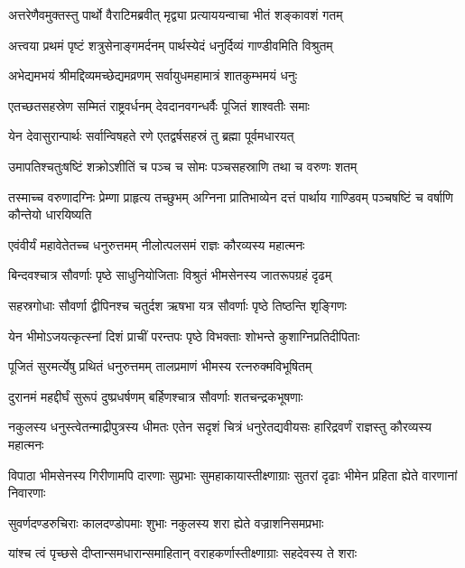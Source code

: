 \twolineshloka
{अत्तरेणैवमुक्तस्तु पार्थो वैराटिमब्रवीत्}
{मृद्व्या प्रत्याययन्वाचा भीतं शङ्कावशं गतम्}




\twolineshloka
{अत्त्वया प्रथमं पृष्टं शत्रुसेनाङ्गमर्दनम्}
{पार्थस्येदं धनुर्दिव्यं गाण्डीवमिति विश्रुतम्}


\twolineshloka
{अभेद्यमभयं श्रीमद्दिव्यमच्छेद्यमव्रणम्}
{सर्वायुधमहामात्रं शातकुम्भमयं धनुः}


\twolineshloka
{एतच्छतसहस्रेण सम्मितं राष्ट्रवर्धनम्}
{देवदानवगन्धर्वैः पूजितं शाश्वतीः समाः}


\twolineshloka
{येन देवासुरान्पार्थः सर्वान्विषहते रणे}
{एतद्वर्षसहस्रं तु ब्रह्मा पूर्वमधारयत्}


\twolineshloka
{उमापतिश्चतुःषष्टिं शक्रोऽशीतिं च पञ्च च}
{सोमः पञ्चसहस्राणि तथा च वरुणः शतम्}


\threelineshloka
{तस्माच्च वरुणादग्निः प्रेम्णा प्राहृत्य तच्छुभम्}
{अग्निना प्रातिभाव्येन दत्तं पार्थाय गाण्डिवम्}
{पञ्चषष्टिं च वर्षाणि कौन्तेयो धारयिष्यति}


\twolineshloka
{एवंवीर्यं महावेतेतच्च धनुरुत्तमम्}
{नीलोत्पलसमं राज्ञः कौरव्यस्य महात्मनः}


\twolineshloka
{बिन्दवश्चात्र सौवर्णाः पृष्ठे साधुनियोजिताः}
{विश्रुतं भीमसेनस्य जातरूपग्रहं दृढम्}


\twolineshloka
{सहस्रगोधाः सौवर्णा द्वीपिनश्च चतुर्दश}
{ऋषभा यत्र सौवर्णाः पृष्ठे तिष्ठन्ति शृङ्गिणः}


\twolineshloka
{येन भीमोऽजयत्कृत्स्नां दिशं प्राचीं परन्तपः}
{पृष्ठे विभक्ताः शोभन्ते कुशाग्निप्रतिदीपिताः}


\twolineshloka
{पूजितं सुरमर्त्येषु प्रथितं धनुरुत्तमम्}
{तालप्रमाणं भीमस्य रत्नरुक्मविभूषितम्}


\twolineshloka
{दुरानमं महद्दीर्घं सुरूपं दुष्प्रधर्षणम्}
{बर्हिणश्चात्र सौवर्णाः शतचन्द्रकभूषणाः}


\threelineshloka
{नकुलस्य धनुस्त्वेतन्माद्रीपुत्रस्य धीमतः}
{एतेन सदृशं चित्रं धनुरेतद्यवीयसः}
{हारिद्रवर्णं राज्ञस्तु कौरव्यस्य महात्मनः}


\threelineshloka
{विपाठा भीमसेनस्य गिरीणामपि दारणाः}
{सुप्रभाः सुमहाकायास्तीक्ष्णाग्राः सुतरां दृढाः}
{भीमेन प्रहिता ह्येते वारणानां निवारणाः}


\twolineshloka
{सुवर्णदण्डरुचिराः कालदण्डोपमाः शुभाः}
{नकुलस्य शरा ह्येते वज्राशनिसमप्रभाः}


\twolineshloka
{यांश्च त्वं पृच्छसे दीप्तान्समधारान्समाहितान्}
{वराहकर्णास्तीक्ष्णाग्राः सहदेवस्य ते शराः}


